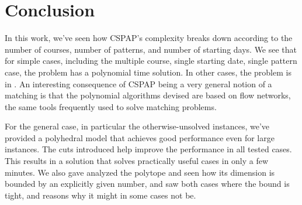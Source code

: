 \chapter{Conclusion}

In this work, we've seen how CSPAP's complexity breaks down according to the number of courses, number of patterns, and number of starting days. We see that for simple cases, including the multiple course, single starting date, single pattern case, the problem has a polynomial time solution. In other cases, the problem is in \npc. An interesting consequence of CSPAP being a very general notion of a matching is that the polynomial algorithms devised are based on flow networks, the same tools frequently used to solve matching problems.

For the general case, in particular the otherwise-unsolved \npc instances, we've provided a polyhedral model that achieves good performance even for large instances. The cuts introduced help improve the performance in all tested cases. This results in a solution that solves practically useful cases in only a few minutes. We also gave analyzed the polytope and seen how its dimension is bounded by an explicitly given number, and saw both cases where the bound is tight, and reasons why it might in some cases not be.
